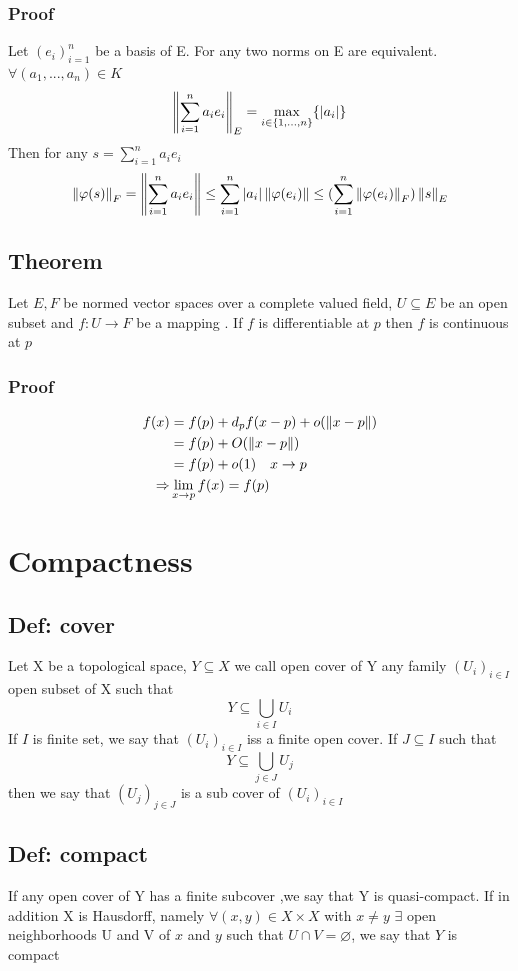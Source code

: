 \documentclass{book}
\newcommand{\abs}[1]{\left\lvert #1 \right\rvert}
\begin{document}
\subsection*{Proof}
Let $(e_i)_{i=1}^n$ be a basis of E. For any two norms on E are equivalent. 
\\$\forall(a_1,...,a_n)\in K$
$$\norm{\sum\limits_{i=1}^na_ie_i}_E=\max\limits_{i\in \{1,...,n\}}\{\abs{a_i}\}$$
Then for any $s=\sum\limits_{i=1}^na_ie_i$
$$\norm{\varphi(s)}_F=\norm{\sum\limits_{i=1}^na_ie_i}\leq\sum\limits_{i=1}^n\abs{a_i}\norm{\varphi(e_i)}\leq(\sum\limits_{i=1}^n\norm{\varphi(e_i)}_F)\norm{s}_E$$
\section{Theorem}
Let $E,F$ be normed vector spaces over a complete valued field, $U\subseteq E$ be an open subset and $f:U\rightarrow F$ be a  mapping . If $f$ is differentiable at $ p$ then $f$ is continuous at $p$
\subsection*{Proof}
$$\begin{aligned}
    f(x) &= f(p)+d_pf(x-p)+o(\left\lVert x-p \right\rVert)\\
    &= f(p)+O(\left\lVert x-p \right\rVert)\\
    &= f(p)+o(1)\quad x\rightarrow p\\
    \Rightarrow &\lim\limits_{x\rightarrow p}f(x)=f(p)
\end{aligned}$$
\chapter{Compactness}
\section{Def: cover}
Let X be a topological space, $Y\subseteq X$ we call open cover of Y any family $(U_i)_{i\in I}$ open subset of X such that $$Y\subseteq\bigcup\limits_{i\in I}U_i$$
If $I$ is finite set, we say that $(U_i)_{i\in I}$ iss a finite open cover. If $J\subseteq I$ such that $$Y\subseteq\bigcup\limits_{j\in J}U_j$$ then we say that $(U_j)_{j\in J}$ is a sub cover of $(U_i)_{i\in I}$
\section{Def: compact}
If any open cover of Y has a finite subcover ,we say that Y is quasi-compact. If in addition X is Hausdorff, namely $\forall(x,y)\in X\times X$ with $x\neq y$ $\exists $ open neighborhoods U and V of $x$ and $y$ such that $U\cap V=\varnothing$, we say that $Y$ is compact  
\end{document}
